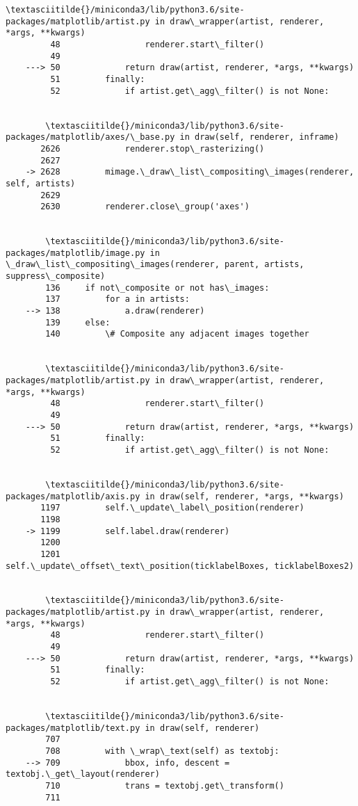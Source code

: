 \documentclass[11pt]{article}
\begin{document}
\begin{Verbatim}[commandchars=\\\{\}]
        \textasciitilde{}/miniconda3/lib/python3.6/site-packages/matplotlib/artist.py in draw\_wrapper(artist, renderer, *args, **kwargs)
         48                 renderer.start\_filter()
         49 
    ---> 50             return draw(artist, renderer, *args, **kwargs)
         51         finally:
         52             if artist.get\_agg\_filter() is not None:


        \textasciitilde{}/miniconda3/lib/python3.6/site-packages/matplotlib/axes/\_base.py in draw(self, renderer, inframe)
       2626             renderer.stop\_rasterizing()
       2627 
    -> 2628         mimage.\_draw\_list\_compositing\_images(renderer, self, artists)
       2629 
       2630         renderer.close\_group('axes')


        \textasciitilde{}/miniconda3/lib/python3.6/site-packages/matplotlib/image.py in \_draw\_list\_compositing\_images(renderer, parent, artists, suppress\_composite)
        136     if not\_composite or not has\_images:
        137         for a in artists:
    --> 138             a.draw(renderer)
        139     else:
        140         \# Composite any adjacent images together


        \textasciitilde{}/miniconda3/lib/python3.6/site-packages/matplotlib/artist.py in draw\_wrapper(artist, renderer, *args, **kwargs)
         48                 renderer.start\_filter()
         49 
    ---> 50             return draw(artist, renderer, *args, **kwargs)
         51         finally:
         52             if artist.get\_agg\_filter() is not None:


        \textasciitilde{}/miniconda3/lib/python3.6/site-packages/matplotlib/axis.py in draw(self, renderer, *args, **kwargs)
       1197         self.\_update\_label\_position(renderer)
       1198 
    -> 1199         self.label.draw(renderer)
       1200 
       1201         self.\_update\_offset\_text\_position(ticklabelBoxes, ticklabelBoxes2)


        \textasciitilde{}/miniconda3/lib/python3.6/site-packages/matplotlib/artist.py in draw\_wrapper(artist, renderer, *args, **kwargs)
         48                 renderer.start\_filter()
         49 
    ---> 50             return draw(artist, renderer, *args, **kwargs)
         51         finally:
         52             if artist.get\_agg\_filter() is not None:


        \textasciitilde{}/miniconda3/lib/python3.6/site-packages/matplotlib/text.py in draw(self, renderer)
        707 
        708         with \_wrap\_text(self) as textobj:
    --> 709             bbox, info, descent = textobj.\_get\_layout(renderer)
        710             trans = textobj.get\_transform()
        711 



\end{Verbatim}
\end{document}

